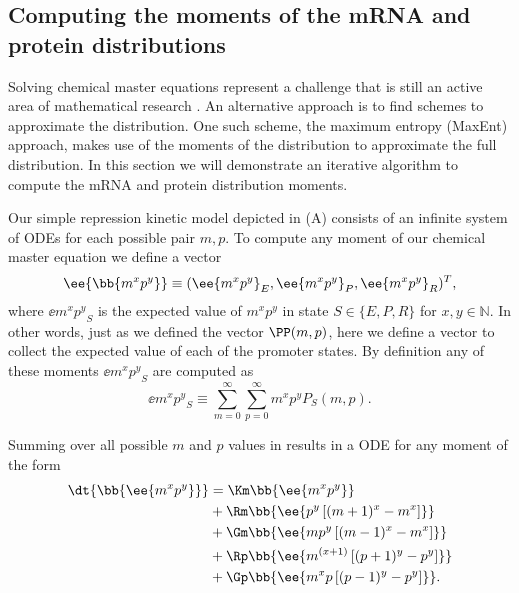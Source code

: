 \subsection*{Computing the moments of the mRNA and protein distributions}
\label{sec_moments}

Solving chemical master equations represent a challenge that is still an active
area of mathematical research \cite{Dinh2016}. An alternative approach is to
find schemes to approximate the distribution. One such scheme, the maximum
entropy (MaxEnt) approach, makes use of the moments of the distribution to
approximate the full distribution. In this section we will demonstrate an
iterative algorithm to compute the mRNA and protein distribution moments.

Our simple repression kinetic model depicted in (A)
consists of an infinite system of ODEs for each possible pair $m, p$. To
compute any moment of our chemical master equation we define a vector
\begin{equation}
	\ee{\bb{m^x p^y}} \equiv (\ee{m^x p^y}_E, \ee{m^x p^y}_P, \ee{m^x p^y}_R)^T,
\end{equation}
where $\ee{m^x p^y}_S$ is the expected value of $m^x p^y$ in state $S \in \{E,
P, R\}$ for $x, y \in \mathbb{N}$. In other words, just as we defined the vector
$\PP(m, p)$, here we define a vector to collect the expected value of each of
the promoter states. By definition any of these moments $\ee{m^x p^y}_S$ are
computed as
\begin{equation}
  \ee{m^x p^y}_S \equiv \sum_{m=0}^\infty \sum_{p=0}^\infty m^x p^y P_S(m, p).
  \label{eq_mom_def}
\end{equation}

Summing over all possible $m$ and $p$ values in  results in a ODE for any moment of the form 
\begin{equation}
  \begin{aligned}
    \dt{\bb{\ee{m^x p^y}}} &=
    \Km \bb{\ee{m^x p^y}}\\
    &+ \Rm \bb{\ee{p^y \left[ (m + 1)^x -m^x \right]}}\\
    &+ \Gm \bb{\ee{m p^y \left[ (m - 1)^x - m^x \right]}}\\
    &+ \Rp \bb{\ee{m^{(x + 1)} \left[ (p + 1)^y - p^y \right]}}\\
    &+ \Gp \bb{\ee{m^x p \left[ (p - 1)^y - p^y \right]}}.
    \label{eq_gral_mom}
  \end{aligned}
\end{equation}


